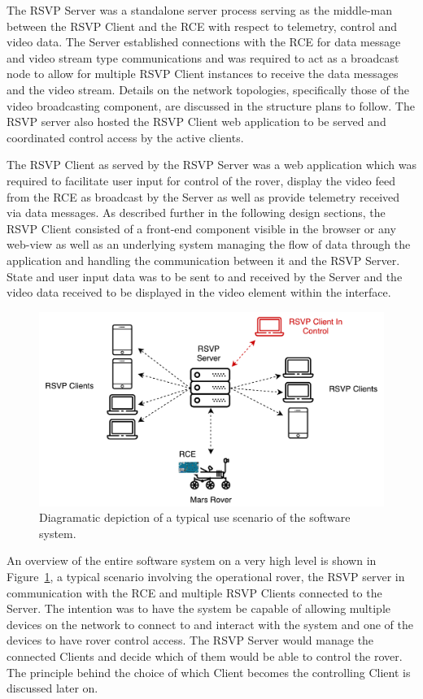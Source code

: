     The RSVP Server was a standalone server process serving as the middle-man between the RSVP Client and the RCE with respect to telemetry, control and video data. The Server established connections with the RCE for data message and video stream type communications and was required to act as a broadcast node to allow for multiple RSVP Client instances to receive the data messages and the video stream. Details on the network topologies, specifically those of the video broadcasting component, are discussed in the structure plans to follow. The RSVP server also hosted the RSVP Client web application to be served and coordinated control access by the active clients.
    
    The RSVP Client as served by the RSVP Server was a web application which was required to facilitate user input for control of the rover, display the video feed from the RCE as broadcast by the Server as well as provide telemetry received via data messages. As described further in the following design sections, the RSVP Client consisted of a front-end component visible in the browser or any web-view as well as an underlying system managing the flow of data through the application and handling the communication between it and the RSVP Server. State and user input data was to be sent to and received by the Server and the video data received to be displayed in the video element within the interface.

    \begin{figure}[h!]
      \centering
      \includegraphics[width=0.7\linewidth]{figures/softDesign-useOverview}
      \caption[Diagramatic depiction of a typical use scenario of the software system.]{Diagramatic depiction of a typical use scenario of the software system.}
      \label{fig:softDesign-useOverview}
    \end{figure}

    An overview of the entire software system on a very high level is shown in Figure~\ref{fig:softDesign-useOverview}, a typical scenario involving the operational rover, the RSVP server in communication with the RCE and multiple RSVP Clients connected to the Server. The intention was to have the system be capable of allowing multiple devices on the network to connect to and interact with the system and one of the devices to have rover control access. The RSVP Server would manage the connected Clients and decide which of them would be able to control the rover. The principle behind the choice of which Client becomes the controlling Client is discussed later on.
    
